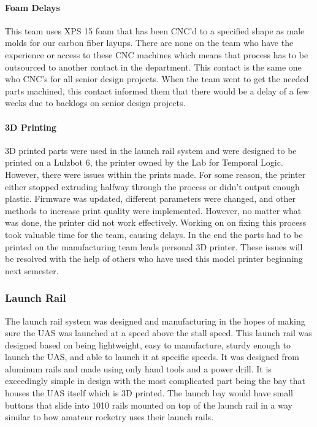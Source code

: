 \documentclass{article}
\begin{document}
\paragraph{Foam Delays}
This team uses XPS 15 foam that has been CNC'd to a specified shape as male molds for our carbon fiber layups. There are none on the team who have the experience or access to these CNC machines which means that process has to be outsourced to another contact in the department. This contact is the same one who CNC's for all senior design projects. When the team went to get the needed parts machined, this contact informed them that there would be a delay of a few weeks due to backlogs on senior design projects.

\paragraph{3D Printing}
3D printed parts were used in the launch rail system and were designed to be printed on a Lulzbot 6, the printer owned by the Lab for Temporal Logic. However, there were issues within the prints made. For some reason, the printer either stopped extruding halfway through the process or didn't output enough plastic. Firmware was updated, different parameters were changed, and other methods to increase print quality were implemented. However, no matter what was done, the printer did not work effectively. Working on on fixing this process took valuable time for the team, causing delays. In the end the parts had to be printed on the manufacturing team leads personal 3D printer. These issues will be resolved with the help of others who have used this model printer beginning next semester.

\subsubsection{Launch Rail}
The launch rail system was designed and manufacturing in the hopes of making sure the UAS was launched at a speed above the stall speed. This launch rail was designed based on being lightweight, easy to manufacture, sturdy enough to launch the UAS, and able to launch it at specific speeds. It was designed from aluminum rails and made using only hand tools and a power drill. It is exceedingly simple in design with the most complicated part being the bay that houses the UAS itself which is 3D printed. The launch bay would have small buttons that slide into 1010 rails mounted on top of the launch rail in a way similar to how amateur rocketry uses their launch rails.
\end{document}
